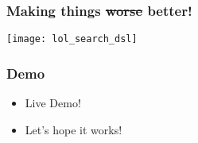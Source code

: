 \documentclass[10pt]{beamer}
\begin{document}
\begin{frame}
\frametitle{Making things \st{worse} better!}
    \texttt{[image: lol\_search\_dsl]}
\end{frame}

\begin{frame}
\frametitle{Demo}
\begin{itemize}
    \item Live Demo!
    \item Let's hope it works!
\end{itemize}
\end{frame}
\end{document}
